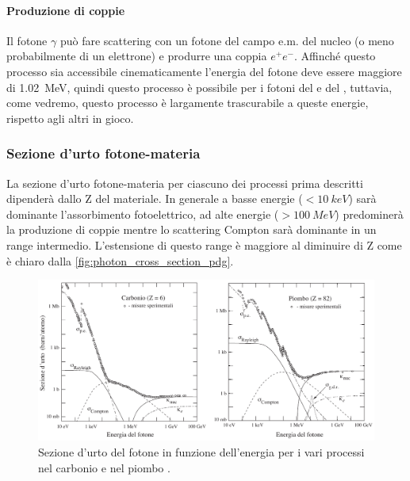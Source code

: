  \paragraph{Produzione di coppie}
 Il fotone $\gamma$ può fare scattering con un fotone del campo e.m. del nucleo (o meno probabilmente di un elettrone) e produrre una coppia $e^+e^-$. Affinché questo processo sia accessibile cinematicamente l'energia del fotone deve essere maggiore di \SI{1.02}{MeV}, quindi questo processo è possibile per i fotoni del \co\;  e del \na, tuttavia, come vedremo, questo processo è largamente trascurabile a queste energie, rispetto agli altri in gioco.
 
 
 \subsubsection{Sezione d'urto fotone-materia} \label{efficiency}
 La sezione d'urto fotone-materia per ciascuno dei processi prima descritti dipenderà dallo Z del materiale. In generale a basse energie ($ < \SI{10}{keV}$) sarà dominante l'assorbimento fotoelettrico, ad alte energie ($>\SI{100}{MeV}$) predominerà la produzione di coppie mentre lo scattering Compton sarà dominante in un range intermedio. L'estensione di questo range è maggiore al diminuire di Z come è chiaro dalla \autoref{fig:photon_cross_section_pdg}.
 
  \begin{figure}[h]
 	\centering
 	\includegraphics[width=\textwidth]{photon-matter-interaction}
 	\caption{\label{fig:photon_cross_section_pdg}Sezione d'urto del fotone in funzione dell'energia per i vari processi nel carbonio e nel piombo \cite{4}.}
 \end{figure}

